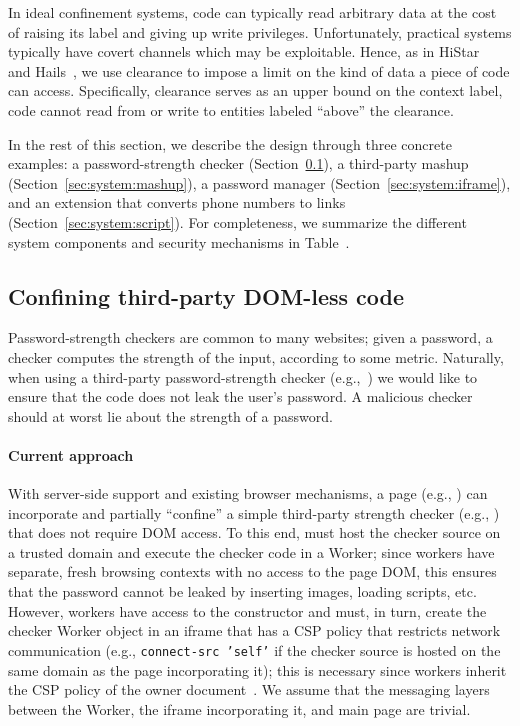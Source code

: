 In ideal confinement systems, code can typically read arbitrary data
at the cost of raising its label and giving up write privileges.
%
Unfortunately, practical systems typically have covert channels which
may be exploitable.
%
Hence, as in HiStar~ and Hails~,
we use clearance to impose a limit on the kind of data a piece of code
can access.
%
Specifically, clearance serves as an upper bound on the context label,
code cannot read from or write to entities labeled ``above'' the
clearance.

In the rest of this section, we describe the \sys{} design through
three concrete examples: a password-strength checker
(Section~\ref{sec:system:worker}), a third-party mashup
(Section~\ref{sec:system:mashup}), a
password manager (Section~\ref{sec:system:iframe}), and an extension
that converts phone numbers to links
(Section~\ref{sec:system:script}).
%
For completeness, we summarize the different system components and
security mechanisms in Table~.



\subsection{Confining third-party DOM-less code}
\label{sec:system:worker}

Password-strength checkers are common to many websites;
%
given a password, a checker computes the strength of the input,
according to some metric.
%
Naturally, when using a third-party password-strength checker
(e.g.,~) we would like to ensure that the
code does not leak the user's password.
%
A malicious checker should at worst lie about the strength of a
password.

\paragraph{Current approach}
With server-side support and existing browser mechanisms, a page
(e.g., ) can incorporate and partially ``confine'' a
simple third-party strength checker (e.g.,
) that does not require DOM access.
%
To this end,  must host the checker source on a
trusted domain and execute the checker code in a Worker; since workers
have separate, fresh browsing contexts with no access to the page DOM,
this ensures that the password cannot be leaked by inserting images,
loading scripts, etc.
%
However, workers have access to the \xhr{} constructor and
 must, in turn, create the checker Worker object in
an iframe that has a CSP policy that restricts network communication
(e.g., \texttt{connect-src 'self'} if the checker source is hosted on
the same domain as the page incorporating it); this is necessary since
workers inherit the CSP policy of the owner document~.
%
We assume that the messaging layers between the Worker, the iframe
incorporating it, and main page are trivial.

